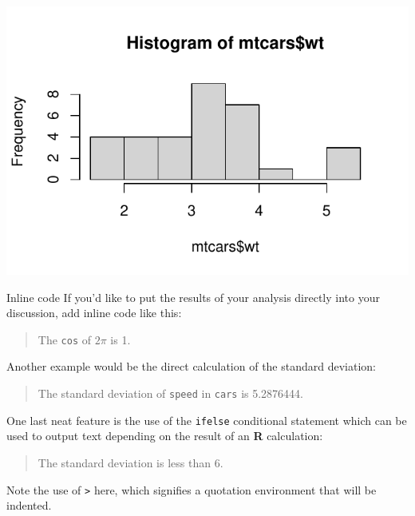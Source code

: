 \documentclass{beamer}
\newenvironment{Shaded}{\begin{snugshade}}{\end{snugshade}}
\newcommand{\FunctionTok}[1]{\textcolor[rgb]{0.00,0.00,0.00}{#1}}
\newcommand{\NormalTok}[1]{#1}
\newcommand{\SpecialCharTok}[1]{\textcolor[rgb]{0.00,0.00,0.00}{#1}}
\begin{document}
\begin{frame}[fragile]
\begin{Shaded}
\end{Shaded}

\includegraphics{presentation1_files/figure-beamer/mtcars2-1.pdf}
\end{frame}

\begin{frame}[fragile]
\begin{block}{Inline code}
\protect\hypertarget{inline-code}{}
If you'd like to put the results of your analysis directly into your
discussion, add inline code like this:

\begin{quote}
The \texttt{cos} of \(2 \pi\) is 1.
\end{quote}

Another example would be the direct calculation of the standard
deviation:

\begin{quote}
The standard deviation of \texttt{speed} in \texttt{cars} is 5.2876444.
\end{quote}
\end{block}
\end{frame}

\begin{frame}[fragile]
One last neat feature is the use of the \texttt{ifelse} conditional
statement which can be used to output text depending on the result of an
\textbf{R} calculation:

\begin{quote}
The standard deviation is less than 6.
\end{quote}

Note the use of \texttt{\textgreater{}} here, which signifies a
quotation environment that will be indented.
\end{frame}
\end{document}
